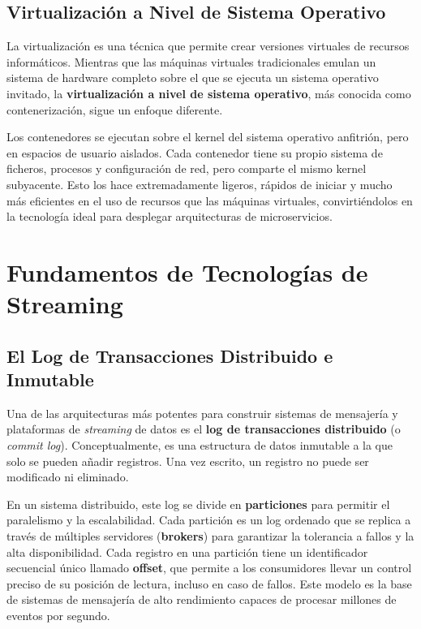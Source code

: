 \subsection{Virtualización a Nivel de Sistema Operativo}
La virtualización es una técnica que permite crear versiones virtuales de recursos informáticos. Mientras que las máquinas virtuales tradicionales emulan un sistema de hardware completo sobre el que se ejecuta un sistema operativo invitado, la \textbf{virtualización a nivel de sistema operativo}, más conocida como contenerización, sigue un enfoque diferente.

Los contenedores se ejecutan sobre el kernel del sistema operativo anfitrión, pero en espacios de usuario aislados. Cada contenedor tiene su propio sistema de ficheros, procesos y configuración de red, pero comparte el mismo kernel subyacente. Esto los hace extremadamente ligeros, rápidos de iniciar y mucho más eficientes en el uso de recursos que las máquinas virtuales, convirtiéndolos en la tecnología ideal para desplegar arquitecturas de microservicios.

\section{Fundamentos de Tecnologías de Streaming}
\label{sec:conceptos_streaming}

\subsection{El Log de Transacciones Distribuido e Inmutable}
Una de las arquitecturas más potentes para construir sistemas de mensajería y plataformas de \textit{streaming} de datos es el \textbf{log de transacciones distribuido} (o \textit{commit log}). Conceptualmente, es una estructura de datos inmutable a la que solo se pueden añadir registros. Una vez escrito, un registro no puede ser modificado ni eliminado.

En un sistema distribuido, este log se divide en \textbf{particiones} para permitir el paralelismo y la escalabilidad. Cada partición es un log ordenado que se replica a través de múltiples servidores (\textbf{brokers}) para garantizar la tolerancia a fallos y la alta disponibilidad. Cada registro en una partición tiene un identificador secuencial único llamado \textbf{offset}, que permite a los consumidores llevar un control preciso de su posición de lectura, incluso en caso de fallos. Este modelo es la base de sistemas de mensajería de alto rendimiento capaces de procesar millones de eventos por segundo.

